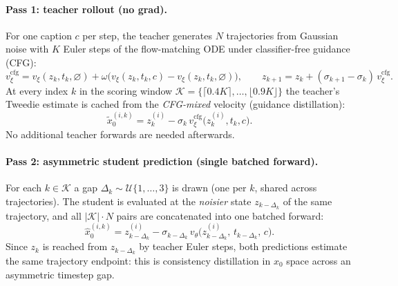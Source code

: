\documentclass[10pt]{article}
\newcommand{\xhat}{\hat{x}_0}
\newcommand{\xtil}{\tilde{x}_0}
\begin{document}
\paragraph{Pass 1: teacher rollout (no grad).}
For one caption $c$ per step, the teacher generates $N$ trajectories from
Gaussian noise with $K$ Euler steps of the flow-matching ODE under
classifier-free guidance (CFG):
\begin{equation}
v^{\mathrm{cfg}}_\xi = v_\xi(z_k, t_k, \varnothing)
  + \omega \big( v_\xi(z_k, t_k, c) - v_\xi(z_k, t_k, \varnothing) \big),
\qquad
z_{k+1} = z_k + (\sigma_{k+1} - \sigma_k)\, v^{\mathrm{cfg}}_\xi .
\end{equation}
At every index $k$ in the scoring window
$\mathcal{K} = \{ \lceil 0.4K \rceil, \dots, \lfloor 0.9K \rfloor \}$ the
teacher's Tweedie estimate is cached from the \emph{CFG-mixed} velocity
(guidance distillation):
\begin{equation}
\xtil^{(i,k)} = z^{(i)}_k - \sigma_k\, v^{\mathrm{cfg}}_\xi\big(z^{(i)}_k, t_k, c\big).
\end{equation}
No additional teacher forwards are needed afterwards.

\paragraph{Pass 2: asymmetric student prediction (single batched forward).}
For each $k \in \mathcal{K}$ a gap $\Delta_k \sim \mathcal{U}\{1, \dots, 3\}$
is drawn (one per $k$, shared across trajectories). The student is evaluated
at the \emph{noisier} state $z_{k - \Delta_k}$ of the same trajectory, and all
$|\mathcal{K}| \cdot N$ pairs are concatenated into one batched forward:
\begin{equation}
\xhat^{(i,k)} = z^{(i)}_{k-\Delta_k}
  - \sigma_{k-\Delta_k}\, v_\theta\big(z^{(i)}_{k-\Delta_k},\, t_{k-\Delta_k},\, c\big).
\end{equation}
Since $z_k$ is reached from $z_{k-\Delta_k}$ by teacher Euler steps, both
predictions estimate the same trajectory endpoint: this is consistency
distillation in $x_0$ space across an asymmetric timestep gap.
\end{document}
